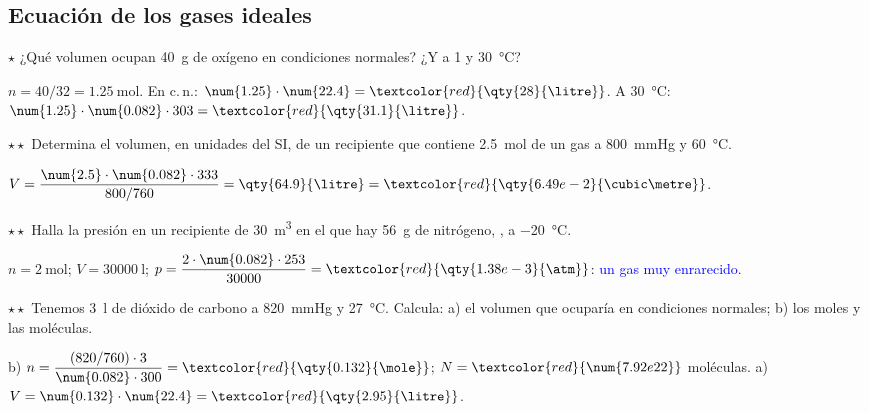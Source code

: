 \subsection{Ecuación de los gases ideales}

\begin{exercise}
    \(\star\) ¿Qué volumen ocupan \qty{40}{\gram} de oxígeno en condiciones normales? ¿Y a \qty{1}{\atm} y \qty{30}{\degreeCelsius}?
    \begin{solu}
        \(n = 40/32 = \qty{1.25}{\mole}\). En c.\,n.: \(\num{1.25} \cdot \num{22.4} = \textcolor{red}{\qty{28}{\litre}}\).
        A \qty{30}{\degreeCelsius}: \(\num{1.25} \cdot \num{0.082} \cdot 303 = \textcolor{red}{\qty{31.1}{\litre}}\).
    \end{solu}
\end{exercise}

\begin{exercise}
    \(\star\star\) Determina el volumen, en unidades del SI, de un recipiente que contiene \qty{2.5}{\mole} de un gas a
    \qty{800}{\mmHg} y \qty{60}{\degreeCelsius}.
    \begin{solu}
        \(V = \dfrac{\num{2.5} \cdot \num{0.082} \cdot 333}{800/760} = \qty{64.9}{\litre} = \textcolor{red}{\qty{6.49e-2}{\cubic\metre}}\).
    \end{solu}
\end{exercise}

\begin{exercise}
    \(\star\star\) Halla la presión en un recipiente de \qty{30}{\cubic\metre} en el que hay \qty{56}{\gram} de nitrógeno, , a
    \qty{-20}{\degreeCelsius}.
    \begin{solu}
        \(n = \qty{2}{\mole}\); \(V = \qty{30000}{\litre}\); \(p = \dfrac{2 \cdot \num{0.082} \cdot 253}{30000} = \textcolor{red}{\qty{1.38e-3}{\atm}}\):
        \textcolor{blue}{un gas muy enrarecido}.
    \end{solu}
\end{exercise}

\begin{exercise}
    \(\star\star\) Tenemos \qty{3}{\litre} de dióxido de carbono a \qty{820}{\mmHg} y \qty{27}{\degreeCelsius}. Calcula: a) el volumen que
    ocuparía en condiciones normales; b) los moles y las moléculas.
    \begin{solu}
        b) \(n = \dfrac{(820/760) \cdot 3}{\num{0.082} \cdot 300} = \textcolor{red}{\qty{0.132}{\mole}}\); \(N = \textcolor{red}{\num{7.92e22}}\) moléculas.
        a) \(V = \num{0.132} \cdot \num{22.4} = \textcolor{red}{\qty{2.95}{\litre}}\).
    \end{solu}
\end{exercise}

